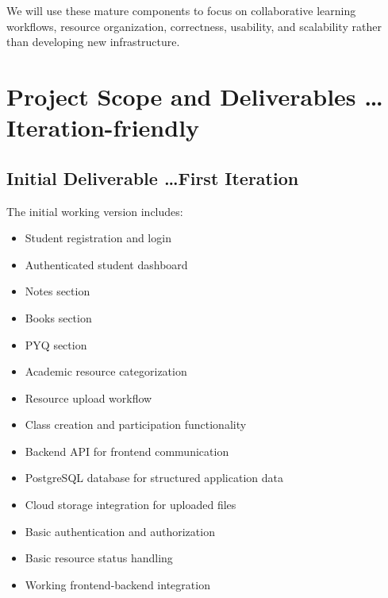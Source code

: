 \documentclass[11pt,a4paper]{article}
\begin{document}
We will use these mature components to focus on collaborative learning workflows, resource organization, correctness, usability, and scalability rather than developing new infrastructure.

\section{Project Scope and Deliverables \dots Iteration-friendly}

\subsection{Initial Deliverable \dots First Iteration}
The initial working version includes:
\begin{itemize}[leftmargin=*]
    \item Student registration and login
    \item Authenticated student dashboard
    \item Notes section
    \item Books section
    \item PYQ section
    \item Academic resource categorization
    \item Resource upload workflow
    \item Class creation and participation functionality
    \item Backend API for frontend communication
    \item PostgreSQL database for structured application data
    \item Cloud storage integration for uploaded files
    \item Basic authentication and authorization
    \item Basic resource status handling
    \item Working frontend-backend integration
\end{itemize}
\end{document}
